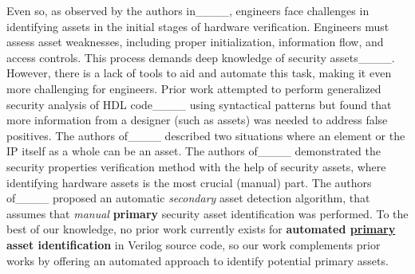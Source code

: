 Even so, as observed by the authors in____, engineers face challenges in identifying assets in the initial stages of hardware verification. 
Engineers must assess asset weaknesses, including proper initialization, information flow, and access controls. This process demands deep knowledge of security assets____. However, there is a lack of tools to aid and automate this task, making it even more challenging for engineers.
Prior work attempted to perform generalized security analysis of \ac{HDL} code____ using syntactical patterns but found that more information from a designer (such as assets) was needed to address false positives. 
The authors of____ described two situations where an element or the \ac{IP} itself as a whole can be an asset.
The authors of____ demonstrated the security properties verification method with the help of security assets, where identifying hardware assets is the most crucial (manual) part. 
The authors of____ proposed an automatic \textit{secondary} asset detection algorithm, that assumes that \textit{manual} \textbf{primary} security asset identification was performed. 
To the best of our knowledge, no prior work currently exists for \textbf{automated \underline{primary} asset identification} in Verilog source code, so our work complements prior works by offering an automated approach to identify potential primary assets.